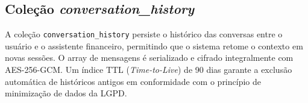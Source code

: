 \subsection{Coleção \textit{conversation\_history}}

A coleção \texttt{conversation\_history} persiste o histórico das conversas entre o usuário e o assistente financeiro, permitindo que o sistema retome o contexto em novas sessões. O array de mensagens é serializado e cifrado integralmente com AES-256-GCM. Um índice TTL (\textit{Time-to-Live}) de 90 dias garante a exclusão automática de históricos antigos em conformidade com o princípio de minimização de dados da LGPD.
